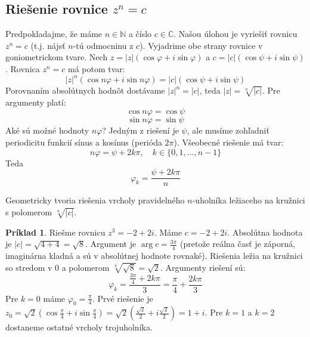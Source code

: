 \documentclass[11pt,a4paper]{article}
\theoremstyle{definition}
\newtheorem{priklad}[definicia]{Príklad}
\theoremstyle{plain}
\theoremstyle{remark}
\newcommand{\Nat}{\mathbb{N}}
\begin{document}
\subsection*{Riešenie rovnice $z^n = c$}
Predpokladajme, že máme $n \in \Nat$ a číslo $c \in \mathbb{C}$. Našou úlohou je vyriešiť rovnicu $z^n = c$ (t.j. nájsť $n$-tú odmocninu z $c$).
Vyjadrime obe strany rovnice v goniometrickom tvare. Nech $z = |z|(\cos \varphi + i \sin \varphi)$ a $c = |c|(\cos \psi + i \sin \psi)$.
Rovnica $z^n = c$ má potom tvar:
\[ |z|^n (\cos n\varphi + i \sin n\varphi) = |c|(\cos \psi + i \sin \psi) \]
Porovnaním absolútnych hodnôt dostávame $|z|^n = |c|$, teda $|z| = \sqrt[n]{|c|}$.
Pre argumenty platí:
\[ \cos n\varphi = \cos \psi \]
\[ \sin n\varphi = \sin \psi \]
Aké sú možné hodnoty $n\varphi$?
Jedným z riešení je $\psi$, ale musíme zohľadniť periodicitu funkcií sínus a kosínus (perióda $2\pi$). Všeobecné riešenie má tvar:
\[ n\varphi = \psi + 2k\pi, \quad k \in \{0, 1, \dots, n-1\} \]
Teda
\[ \varphi_k = \frac{\psi + 2k\pi}{n} \]

Geometricky tvoria riešenia vrcholy pravidelného $n$-uholníka ležiaceho na kružnici s polomerom $\sqrt[n]{|c|}$.

\begin{priklad}
Riešme rovnicu $z^3 = -2 + 2i$.
Máme $c = -2+2i$. Absolútna hodnota je $|c| = \sqrt{4+4} = \sqrt{8}$.
Argument je $\arg c = \frac{3\pi}{4}$ (pretože reálna časť je záporná, imaginárna kladná a sú v absolútnej hodnote rovnaké).
Riešenia ležia na kružnici so stredom v 0 a polomerom $\sqrt[3]{\sqrt{8}} = \sqrt{2}$.
Argumenty riešení sú:
\[ \varphi_k = \frac{\frac{3\pi}{4} + 2k\pi}{3} = \frac{\pi}{4} + \frac{2k\pi}{3} \]
Pre $k=0$ máme $\varphi_0 = \frac{\pi}{4}$. Prvé riešenie je $z_0 = \sqrt{2}(\cos \frac{\pi}{4} + i \sin \frac{\pi}{4}) = \sqrt{2}(\frac{\sqrt{2}}{2} + i\frac{\sqrt{2}}{2}) = 1+i$.
Pre $k=1$ a $k=2$ dostaneme ostatné vrcholy trojuholníka.
\end{priklad}
\end{document}
